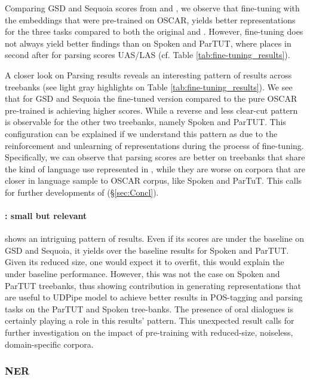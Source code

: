 Comparing GSD and Sequoia scores from \ELMooscar and \ELMocoscar, we observe that fine-tuning with \Cabernet the embeddings that were pre-trained on OSCAR, yields better representations for the three tasks compared to both the original \ELMooscar and \ELMococa. However, fine-tuning does not always yield better findings than \ELMooscar on Spoken and ParTUT, where \ELMocoscar places in second after \ELMooscar for parsing scores UAS/LAS (cf. Table \ref{tab:fine-tuning_results}).

A closer look on Parsing results reveals an interesting pattern of results across treebanks (see light gray highlights on Table \ref{tab:fine-tuning_results}). We see that for GSD and Sequoia the \Cabernet fine-tuned version \ELMocoscar compared to the pure OSCAR pre-trained \ELMooscar is achieving higher scores. While a reverse and less clear-cut pattern is observable for the other two treebanks, namely Spoken and ParTUT. This configuration can be explained if we understand this pattern as due to the reinforcement and unlearning of \ELMooscar representations during the process of fine-tuning. Specifically, we can observe that parsing scores are better on treebanks that share the kind of language use represented in \Cabernet, while they are worse on corpora that are closer in language sample to OSCAR corpus, like Spoken and ParTuT. This calls for further developments of \Cabernet (§\ref{sec:Concl}).

\paragraph{\ELMocbt: small but relevant}
\ELMocbt shows an intriguing pattern of results. Even if its scores are under the baseline on GSD and Sequoia, it yields over the baseline results for Spoken and ParTUT. Given its reduced size, one would expect it to overfit, this would explain the under baseline performance. However, this was not the case on Spoken and ParTUT treebanks, thus showing \ELMocbt contribution in generating representations that are useful to UDPipe model to achieve better results in POS-tagging and parsing tasks on the ParTUT and Spoken tree-banks. The presence of oral dialogues is certainly playing a role in this results' pattern. This unexpected result calls for further investigation on the impact of pre-training with reduced-size, noiseless, domain-specific corpora.


\subsubsection{NER} \label{sect:ResultsNER}

